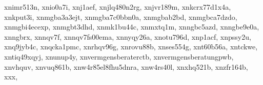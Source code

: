 \documentclass[letterpaper,10pt,english]{sphinxmanual}
\begin{document}
\begin{fulllineitems}
\begin{fulllineitems}
\textquotesingle{}xn\sphinxhyphen{}\sphinxhyphen{}imr513n\textquotesingle{}, \textquotesingle{}xn\sphinxhyphen{}\sphinxhyphen{}io0a7i\textquotesingle{}, \textquotesingle{}xn\sphinxhyphen{}\sphinxhyphen{}j1aef\textquotesingle{}, \textquotesingle{}xn\sphinxhyphen{}\sphinxhyphen{}jlq480n2rg\textquotesingle{}, \textquotesingle{}xn\sphinxhyphen{}\sphinxhyphen{}jvr189m\textquotesingle{}, \textquotesingle{}xn\sphinxhyphen{}\sphinxhyphen{}kcrx77d1x4a\textquotesingle{}, \textquotesingle{}xn\sphinxhyphen{}\sphinxhyphen{}kput3i\textquotesingle{}, \textquotesingle{}xn\sphinxhyphen{}\sphinxhyphen{}mgba3a3ejt\textquotesingle{}, \textquotesingle{}xn\sphinxhyphen{}\sphinxhyphen{}mgba7c0bbn0a\textquotesingle{}, \textquotesingle{}xn\sphinxhyphen{}\sphinxhyphen{}mgbab2bd\textquotesingle{}, \textquotesingle{}xn\sphinxhyphen{}\sphinxhyphen{}mgbca7dzdo\textquotesingle{}, \textquotesingle{}xn\sphinxhyphen{}\sphinxhyphen{}mgbi4ecexp\textquotesingle{}, \textquotesingle{}xn\sphinxhyphen{}\sphinxhyphen{}mgbt3dhd\textquotesingle{}, \textquotesingle{}xn\sphinxhyphen{}\sphinxhyphen{}mk1bu44c\textquotesingle{}, \textquotesingle{}xn\sphinxhyphen{}\sphinxhyphen{}mxtq1m\textquotesingle{}, \textquotesingle{}xn\sphinxhyphen{}\sphinxhyphen{}ngbc5azd\textquotesingle{}, \textquotesingle{}xn\sphinxhyphen{}\sphinxhyphen{}ngbe9e0a\textquotesingle{}, \textquotesingle{}xn\sphinxhyphen{}\sphinxhyphen{}ngbrx\textquotesingle{}, \textquotesingle{}xn\sphinxhyphen{}\sphinxhyphen{}nqv7f\textquotesingle{}, \textquotesingle{}xn\sphinxhyphen{}\sphinxhyphen{}nqv7fs00ema\textquotesingle{}, \textquotesingle{}xn\sphinxhyphen{}\sphinxhyphen{}nyqy26a\textquotesingle{}, \textquotesingle{}xn\sphinxhyphen{}\sphinxhyphen{}otu796d\textquotesingle{}, \textquotesingle{}xn\sphinxhyphen{}\sphinxhyphen{}p1acf\textquotesingle{}, \textquotesingle{}xn\sphinxhyphen{}\sphinxhyphen{}pssy2u\textquotesingle{}, \textquotesingle{}xn\sphinxhyphen{}\sphinxhyphen{}q9jyb4c\textquotesingle{}, \textquotesingle{}xn\sphinxhyphen{}\sphinxhyphen{}qcka1pmc\textquotesingle{}, \textquotesingle{}xn\sphinxhyphen{}\sphinxhyphen{}rhqv96g\textquotesingle{}, \textquotesingle{}xn\sphinxhyphen{}\sphinxhyphen{}rovu88b\textquotesingle{}, \textquotesingle{}xn\sphinxhyphen{}\sphinxhyphen{}ses554g\textquotesingle{}, \textquotesingle{}xn\sphinxhyphen{}\sphinxhyphen{}t60b56a\textquotesingle{}, \textquotesingle{}xn\sphinxhyphen{}\sphinxhyphen{}tckwe\textquotesingle{}, \textquotesingle{}xn\sphinxhyphen{}\sphinxhyphen{}tiq49xqyj\textquotesingle{}, \textquotesingle{}xn\sphinxhyphen{}\sphinxhyphen{}unup4y\textquotesingle{}, \textquotesingle{}xn\sphinxhyphen{}\sphinxhyphen{}vermgensberater\sphinxhyphen{}ctb\textquotesingle{}, \textquotesingle{}xn\sphinxhyphen{}\sphinxhyphen{}vermgensberatung\sphinxhyphen{}pwb\textquotesingle{}, \textquotesingle{}xn\sphinxhyphen{}\sphinxhyphen{}vhquv\textquotesingle{}, \textquotesingle{}xn\sphinxhyphen{}\sphinxhyphen{}vuq861b\textquotesingle{}, \textquotesingle{}xn\sphinxhyphen{}\sphinxhyphen{}w4r85el8fhu5dnra\textquotesingle{}, \textquotesingle{}xn\sphinxhyphen{}\sphinxhyphen{}w4rs40l\textquotesingle{}, \textquotesingle{}xn\sphinxhyphen{}\sphinxhyphen{}xhq521b\textquotesingle{}, \textquotesingle{}xn\sphinxhyphen{}\sphinxhyphen{}zfr164b\textquotesingle{}, \textquotesingle{}xxx\textquotesingle{}, 
\end{fulllineitems}
\end{fulllineitems}
\end{document}
